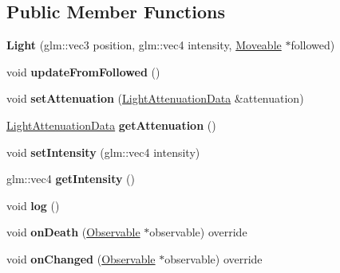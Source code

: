 \subsection*{Public Member Functions}
\begin{DoxyCompactItemize}
\item 
\mbox{\label{classflw_1_1flf_1_1Light_a36084a4a54fad153bf47c7c3c4759809}} 
{\bfseries Light} (glm\+::vec3 position, glm\+::vec4 intensity, \hyperlink{classflw_1_1flf_1_1Moveable}{Moveable} $\ast$followed)
\item 
\mbox{\label{classflw_1_1flf_1_1Light_a66488fb86f264c9b9235880f43068d79}} 
void {\bfseries update\+From\+Followed} ()
\item 
\mbox{\label{classflw_1_1flf_1_1Light_a36e8aa7f8645aefb2ab4ec6d54895158}} 
void {\bfseries set\+Attenuation} (\hyperlink{structflw_1_1flf_1_1LightAttenuationData}{Light\+Attenuation\+Data} \&attenuation)
\item 
\mbox{\label{classflw_1_1flf_1_1Light_aa057776a1eb1796978ebcd334574f1de}} 
\hyperlink{structflw_1_1flf_1_1LightAttenuationData}{Light\+Attenuation\+Data} {\bfseries get\+Attenuation} ()
\item 
\mbox{\label{classflw_1_1flf_1_1Light_a1d8e6e0e191a3c47a3ea87a62445d89c}} 
void {\bfseries set\+Intensity} (glm\+::vec4 intensity)
\item 
\mbox{\label{classflw_1_1flf_1_1Light_aadb91107eef0e1e24363a2b757e649e1}} 
glm\+::vec4 {\bfseries get\+Intensity} ()
\item 
\mbox{\label{classflw_1_1flf_1_1Light_ac5313d3d1b9a37f486aae0de56bccaa0}} 
void {\bfseries log} ()
\item 
\mbox{\label{classflw_1_1flf_1_1Light_a818069ca94cb8932324eea986146a7f0}} 
void {\bfseries on\+Death} (\hyperlink{classflw_1_1flf_1_1Observable}{Observable} $\ast$observable) override
\item 
\mbox{\label{classflw_1_1flf_1_1Light_a150573245975df8e0e436f590c85d239}} 
void {\bfseries on\+Changed} (\hyperlink{classflw_1_1flf_1_1Observable}{Observable} $\ast$observable) override
\end{DoxyCompactItemize}
